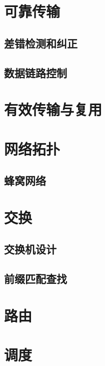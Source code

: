 \documentclass[12pt,a4paper]{book}
\begin{document}
\chapter{可靠传输}


\section{差错检测和纠正}


\section{数据链路控制}


\chapter{有效传输与复用}


\chapter{网络拓扑}


\section{蜂窝网络}


\chapter{交换}


\section{交换机设计}


\section{前缀匹配查找}


\chapter{路由}


\chapter{调度}

\end{document}
